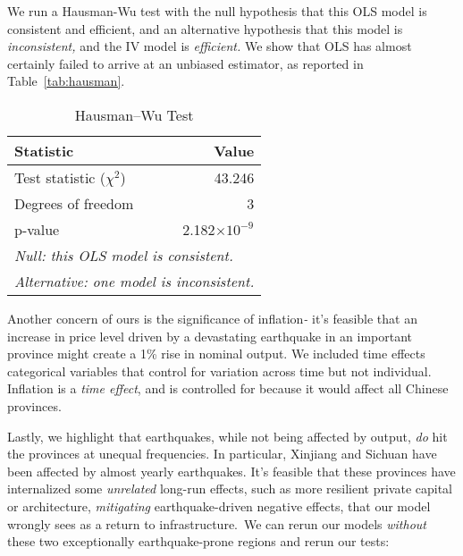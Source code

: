 \documentclass[11pt]{article}
\begin{document}
We run a Hausman-Wu test with the null hypothesis that this OLS model is consistent and efficient, and an alternative hypothesis that this model is \textit{inconsistent, }and the IV model is \textit{efficient. }We show that OLS has almost certainly failed to arrive at an unbiased estimator, as reported in Table~\ref{tab:hausman}.

\begin{table}[!ht]
\centering
\caption{Hausman--Wu Test }
\label{tab:Hausman}

\begin{tabular}{l r}
\hline
Statistic & Value \\ 
\hline
Test statistic ($\chi^{2}$) & 43.246 \\ 
Degrees of freedom          & 3 \\ 
p-value                     & 2.182$\times 10^{-9}$ \\ 
\hline
\multicolumn{2}{l}{\footnotesize\textit{Null: this OLS model is consistent.}}\\
\multicolumn{2}{l}{\footnotesize\textit{Alternative: one model is inconsistent.}}\\
\hline
\end{tabular}

\end{table}

     

 
Another concern of ours is the significance of inflation\textit{- }it’s feasible that an increase in price level driven by a devastating earthquake in an important province might create a 1\% rise in nominal output. We included time effects categorical variables that control for variation across time but not individual. Inflation is a \textit{time effect}, and is controlled for because it would affect all Chinese provinces. 

Lastly, we highlight that earthquakes, while not being affected by output, \textit{do }hit the provinces at unequal frequencies. In particular, Xinjiang and Sichuan have been affected by almost yearly earthquakes. It’s feasible that these provinces have internalized some \textit{unrelated }long-run effects, such as more resilient private capital or architecture, \textit{mitigating }earthquake-driven negative effects, that our model wrongly sees as a return to infrastructure. We can rerun our models \textit{without }these two exceptionally earthquake-prone regions and rerun our tests:\\
\end{document}
